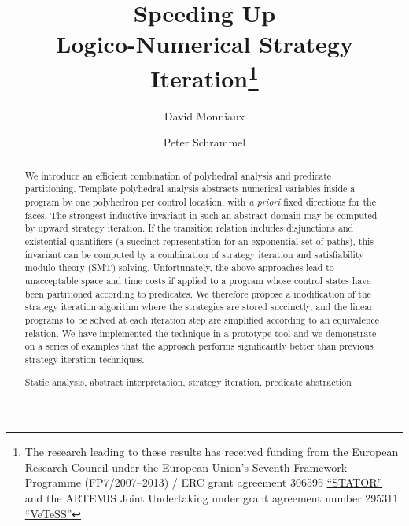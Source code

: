 \documentclass{llncs}
\author{David Monniaux\inst{1} \and Peter Schrammel\inst{2}}
\institute{CNRS / VERIMAG \and University of Oxford}
\title{Speeding Up \\ Logico-Numerical Strategy
  Iteration\rronly{\\(extended version)}\thanks{The research leading to these results has received funding
    from the European Research Council under the European Union’s
    Seventh Framework Programme (FP7/2007–2013) / ERC grant agreement
    306595 \href{http://stator.imag.fr/}{``STATOR''}
    and the ARTEMIS Joint Undertaking under grant
    agreement number 295311 \href{http://vetess.eu/}{``VeTeSS''}}}
\newcommand{\rronly}[1]{#1}
\begin{document}
\maketitle

\begin{abstract}
We introduce an efficient combination of polyhedral analysis and predicate
partitioning.
Template polyhedral analysis abstracts numerical variables inside a
program by one polyhedron per control location, with \emph{a priori}
fixed directions for the faces. The strongest inductive invariant in
such an abstract domain may be computed by upward strategy
iteration. If the transition relation includes disjunctions and
existential quantifiers\rronly{ (a succinct representation for an exponential
set of paths)}, this invariant can be computed by a combination of
strategy iteration and satisfiability modulo theory (SMT) solving.
Unfortunately, the above approaches lead to unacceptable space and
time costs if applied to a program whose control states have been
partitioned according to predicates. We therefore propose a
modification of the strategy iteration algorithm where the strategies
are stored succinctly, and the linear programs to be solved at each
iteration step are simplified according to an equivalence
relation. 
We have implemented the technique in a prototype tool and we
demonstrate on a series of examples that the approach performs
significantly better than previous strategy iteration techniques.
\begin{keywords}
Static analysis, abstract interpretation, strategy iteration, predicate abstraction
\end{keywords}
\end{abstract}
\end{document}
